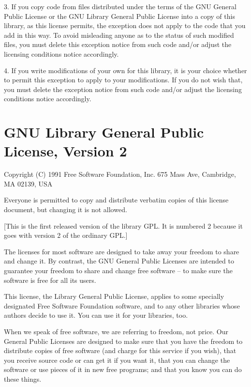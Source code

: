 3. If you copy code from files distributed under the terms of the GNU 
General Public License or the GNU Library General Public License into a 
copy of this library, as this license permits, the exception does not 
apply to the code that you add in this way. To avoid misleading anyone as 
to the status of such modified files, you must delete this exception 
notice from such code and/or adjust the licensing conditions notice
accordingly. 

4. If you write modifications of your own for this library, it is your 
choice whether to permit this exception to apply to your modifications. 
If you do not wish that, you must delete the exception notice from such 
code and/or adjust the licensing conditions notice accordingly. 

\section*{GNU Library General Public License, Version 2}

Copyright (C) 1991 Free Software Foundation, Inc.
675 Mass Ave, Cambridge, MA 02139, USA

Everyone is permitted to copy and distribute verbatim copies
of this license document, but changing it is not allowed.

[This is the first released version of the library GPL. It is
numbered 2 because it goes with version 2 of the ordinary GPL.]


The licenses for most software are designed to take away your
freedom to share and change it. By contrast, the GNU General Public
Licenses are intended to guarantee your freedom to share and change
free software -- to make sure the software is free for all its users.

This license, the Library General Public License, applies to some
specially designated Free Software Foundation software, and to any
other libraries whose authors decide to use it. You can use it for
your libraries, too.

When we speak of free software, we are referring to freedom, not
price. Our General Public Licenses are designed to make sure that you
have the freedom to distribute copies of free software (and charge for
this service if you wish), that you receive source code or can get it
if you want it, that you can change the software or use pieces of it
in new free programs; and that you know you can do these things.

